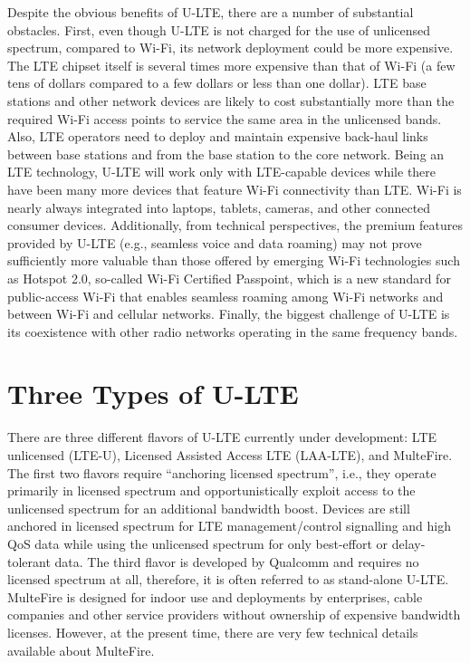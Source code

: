 Despite the obvious benefits of \mbox{U-LTE}, there are a number of substantial obstacles. First, even though \mbox{U-LTE} is not charged for the use of unlicensed spectrum, compared to \mbox{Wi-Fi}, its network deployment could be more expensive. The LTE chipset itself is several times more expensive than that of \mbox{Wi-Fi} (a few tens of dollars compared to a few dollars or less than one dollar). LTE base stations and other network devices are likely to cost substantially more than the required \mbox{Wi-Fi} access points to service the same area in the unlicensed bands.  Also, LTE operators need to deploy and maintain expensive back-haul links between base stations and from the base station to the core network. Being an LTE technology, \mbox{U-LTE} will work only with LTE-capable devices while there have been many more devices that feature \mbox{Wi-Fi} connectivity than LTE. \mbox{Wi-Fi} is nearly always integrated into laptops, tablets, cameras, and other connected consumer devices. Additionally, from technical perspectives, the premium features provided by \mbox{U-LTE} (e.g., seamless voice and data roaming) may not prove sufficiently more valuable than those offered by emerging \mbox{Wi-Fi} technologies such as Hotspot 2.0, so-called \mbox{Wi-Fi} Certified Passpoint, which is a new standard for public-access \mbox{Wi-Fi} that enables seamless roaming among \mbox{Wi-Fi} networks and between \mbox{Wi-Fi} and cellular networks. Finally, the biggest challenge of \mbox{U-LTE} is its coexistence with other radio networks operating in the same frequency bands. 

\section{Three Types of U-LTE}
\label{lte-types}
There are three different flavors of \mbox{U-LTE} currently under development: LTE unlicensed (\mbox{LTE-U}), Licensed Assisted Access LTE (\mbox{LAA-LTE}), and MulteFire. The first two flavors require ``anchoring licensed spectrum'', i.e., they operate primarily in licensed spectrum and opportunistically exploit access to the unlicensed spectrum for an additional bandwidth boost. Devices are still anchored in licensed spectrum for LTE management/control signalling and high QoS data while using the unlicensed spectrum for only best-effort or delay-tolerant data. The third flavor is developed by Qualcomm and requires no licensed spectrum at all, therefore, it is often referred to as stand-alone \mbox{U-LTE}. MulteFire is designed for indoor use and deployments by enterprises, cable companies and other service providers without ownership of expensive bandwidth licenses. However, at the present time, there are very few technical details available about MulteFire.


